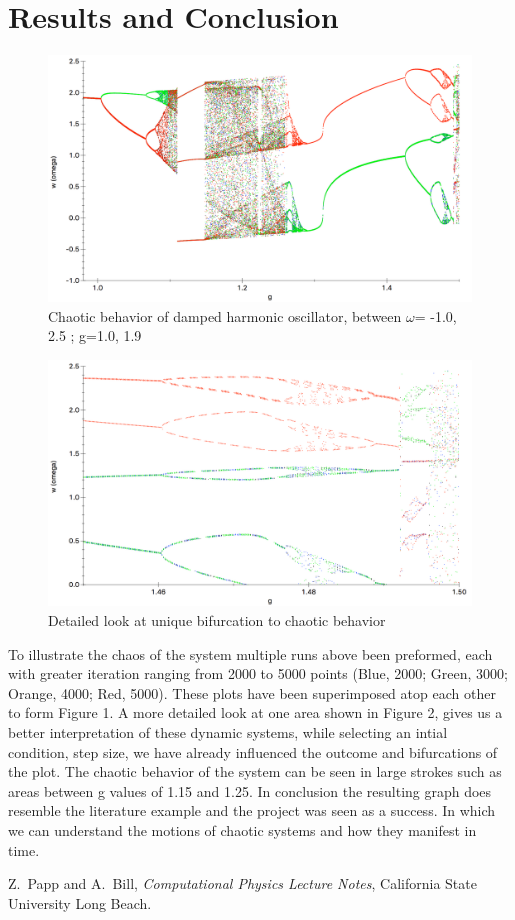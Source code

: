 \documentclass[12pt,letterpaper,notitlepage]{article}
\begin{document}
\section{Results and Conclusion}	
	\begin{figure}[H]
		\includegraphics[width=1.\textwidth]{bif.png}
		\caption{Chaotic behavior of damped harmonic oscillator, between $\omega$= -1.0, 2.5 ; g=1.0, 1.9}
	\end{figure}  
	\begin{figure}[H]
		\includegraphics[width=1.\textwidth]{bif2.png}
		\caption{Detailed look at unique bifurcation to chaotic behavior} 
	\end{figure}    
To illustrate the chaos of the system multiple runs above been preformed, each with greater iteration ranging from 2000 to 5000 points (Blue, 2000; Green, 3000; Orange, 4000; Red, 5000). These plots have been superimposed atop each other to form Figure 1. A more detailed look at one area shown in Figure 2, gives us a better interpretation of these dynamic systems, while selecting an intial condition, step size, we have already influenced the outcome and bifurcations of the plot. The chaotic behavior of the system can be seen in large strokes such as areas between g values of 1.15 and 1.25. In conclusion the resulting graph does resemble the literature example and the project was seen as a success. In which we can understand the motions of chaotic systems and how they manifest in time.   
\newpage
\begin{thebibliography}{}
	Z.~Papp and A.~Bill, {\it Computational Physics Lecture Notes}, California State University Long Beach.

\end{thebibliography}
\end{document}
